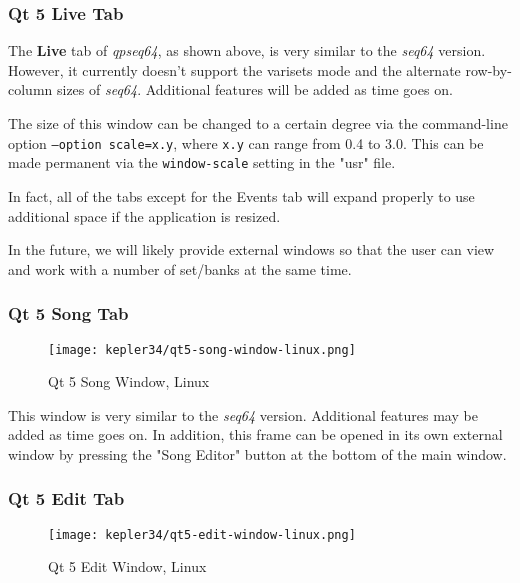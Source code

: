 \subsubsection{Qt 5 Live Tab}
\label{subsubsec:qt_portmidi_qt5_live_tab}

   The \textbf{Live} tab of \textsl{qpseq64}, as shown above, is very similar
   to the \textsl{seq64} version.  However, it currently doesn't support the
   varisets mode and the alternate row-by-column sizes of \textsl{seq64}.
   Additional features will be added as time goes on.

   The size of this window can be changed to a certain degree via
   the command-line option \texttt{--option scale=x.y}, where \texttt{x.y} can
   range from 0.4 to 3.0.  This can be made permanent via the
   \texttt{window-scale} setting in the "usr" file.

   In fact, all of the tabs except for the Events tab will expand properly to
   use additional space if the application is resized.

   In the future, we will likely provide external windows so that the user can
   view and work with a number of set/banks at the same time.

\subsubsection{Qt 5 Song Tab}
\label{subsubsec:qt_portmidi_qt5_song_tab}

\begin{figure}[H]
   \centering 
   \texttt{[image: kepler34/qt5-song-window-linux.png]}
   \caption{Qt 5 Song Window, Linux}
   \label{fig:qt5_song_window_linux}
\end{figure}

   This window is very similar to the \textsl{seq64} version.
   Additional features may be added as time goes on.  In addition,
   this frame can be opened in its own external window by
   pressing the "Song Editor" button at the bottom of the main window.

\subsubsection{Qt 5 Edit Tab}
\label{subsubsec:qt_portmidi_qt5_edit_tab}

\begin{figure}[H]
   \centering 
   \texttt{[image: kepler34/qt5-edit-window-linux.png]}
   \caption{Qt 5 Edit Window, Linux}
   \label{fig:qt5_edit_window_linux}
\end{figure}

